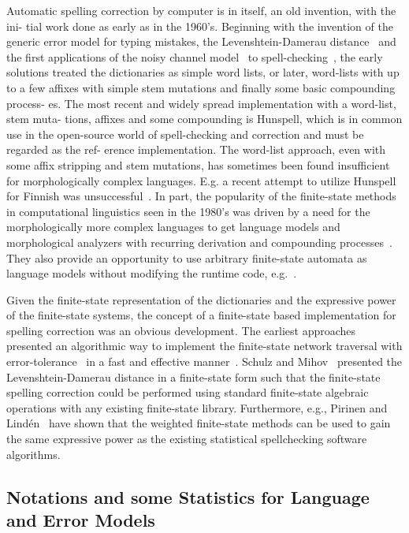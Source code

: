 \documentclass[postprint]{flammie}
\begin{document}
Automatic spelling correction by computer is in itself, an old invention, with
the ini- tial work done as early as in the 1960’s. Beginning with the invention
of the generic error model for typing mistakes, the Levenshtein-Damerau
distance~\cite{damerau1964technique,levenshtein1965binary} and the first
applications of the noisy channel model~\cite{shannon1948mathematical} to
spell-checking~\cite{raviv1967decision}, the early solutions treated the
dictionaries as simple word lists, or later, word-lists with up to a few
affixes with simple stem mutations and finally some basic compounding process-
es. The most recent and widely spread implementation with a word-list, stem
muta- tions, affixes and some compounding is Hunspell, which is in common use
in the open-source world of spell-checking and correction and must be regarded
as the ref- erence implementation. The word-list approach, even with some affix
stripping and stem mutations, has sometimes been found insufficient for
morphologically complex languages. E.g. a recent attempt to utilize Hunspell
for Finnish was unsuccessful~\cite{pitkanen2006hunspell}. In part, the
popularity of the finite-state methods in computational linguistics seen in the
1980’s was driven by a need for the morphologically more complex languages to
get language models and morphological analyzers with recurring derivation and
compounding processes~\cite{beesley2004morphological}. They also provide an
opportunity to use arbitrary finite-state automata as language models without
modifying the runtime code, e.g.~\cite{pirinen2010finite}.

Given the finite-state representation of the dictionaries and the expressive
power of the finite-state systems, the concept of a finite-state based
implementation for spelling correction was an obvious development. The earliest
approaches presented an algorithmic way to implement the finite-state network
traversal with error-tolerance~\cite{oflazer1996errortolerant} in a fast and
effective manner~\cite{hulden2009fast,savary2002typographical}. Schulz
and Mihov~\cite{schulz2002fast} presented the Levenshtein-Damerau distance in a
finite-state form such that the finite-state spelling correction could be
performed using standard finite-state algebraic operations with any existing
finite-state library. Furthermore, e.g., Pirinen and
Lindén~\cite{pirinen2010creating} have shown that the weighted finite-state
methods can be used to gain the same expressive power as the existing
statistical spellchecking software algorithms.

\subsection{Notations and some Statistics for Language and Error Models}
\end{document}
